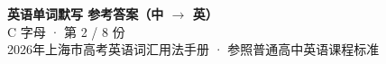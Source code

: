 \documentclass[10pt,a4paper]{article}
\begin{document}
\pagestyle{plain}

\begin{center}
{\LARGE\bfseries 英语单词默写 \quad 参考答案（中 $\to$ 英）}\\[0.22em]
{\large C 字母 · 第 2 / 8 份}\\[0.18em]
{\small 2026年上海市高考英语词汇用法手册 · 参照普通高中英语课程标准}
\end{center}

\vspace{0.2em}
\noindent{\color{rulegray}\rule{\textwidth}{0.8pt}}

\vspace{0.35em}

\vspace{0.25em}
\renewcommand{\arraystretch}{1.32}
\end{document}
